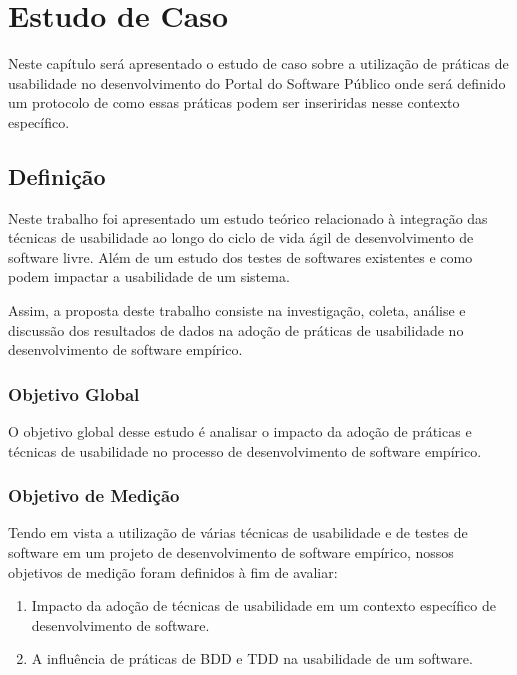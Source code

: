 \chapter{Estudo de Caso}



Neste capítulo será apresentado o estudo de caso sobre a utilização de práticas de usabilidade no desenvolvimento do Portal do Software Público onde será definido um protocolo de como essas práticas podem ser inseriridas nesse contexto específico.





\section{Definição}
Neste trabalho foi apresentado um estudo teórico relacionado à integração das técnicas de usabilidade ao longo do ciclo de vida ágil de desenvolvimento de software livre. Além de um estudo dos testes de softwares existentes e como podem impactar a usabilidade de um sistema.


Assim, a proposta deste trabalho consiste na investigação, coleta, análise e discussão dos resultados de dados na adoção de práticas de usabilidade no desenvolvimento de software empírico.

\subsection{Objetivo Global}

O objetivo global desse estudo é analisar o impacto da adoção de práticas e técnicas de usabilidade no processo de desenvolvimento de software empírico.


\subsection{Objetivo de Medição}

Tendo em vista a utilização de várias técnicas de usabilidade e de testes de software em um projeto de desenvolvimento de software empírico, nossos objetivos de medição foram definidos à fim de avaliar:

\begin{enumerate}
\item Impacto da adoção de técnicas de usabilidade em um contexto específico de desenvolvimento de software.
\item A influência de práticas de BDD e TDD na usabilidade de um software. 
\end{enumerate}

